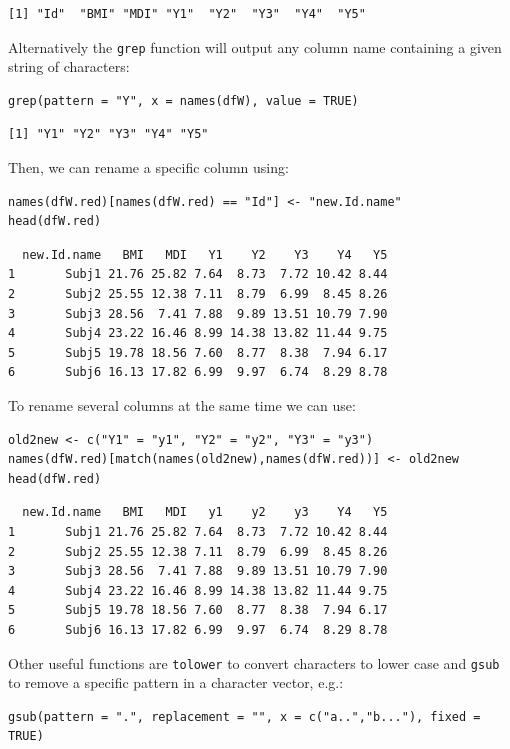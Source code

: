 \documentclass{article}
\begin{document}
\begin{verbatim}
[1] "Id"  "BMI" "MDI" "Y1"  "Y2"  "Y3"  "Y4"  "Y5"
\end{verbatim}

Alternatively the \texttt{grep} function will output any column name
containing a given string of characters:
\lstset{language=r,label= ,caption= ,captionpos=b,numbers=none}
\begin{lstlisting}
grep(pattern = "Y", x = names(dfW), value = TRUE)
\end{lstlisting}

\begin{verbatim}
[1] "Y1" "Y2" "Y3" "Y4" "Y5"
\end{verbatim}

Then, we can rename a specific column using:
\lstset{language=r,label= ,caption= ,captionpos=b,numbers=none}
\begin{lstlisting}
names(dfW.red)[names(dfW.red) == "Id"] <- "new.Id.name"
head(dfW.red)
\end{lstlisting}

\begin{verbatim}
  new.Id.name   BMI   MDI   Y1    Y2    Y3    Y4   Y5
1       Subj1 21.76 25.82 7.64  8.73  7.72 10.42 8.44
2       Subj2 25.55 12.38 7.11  8.79  6.99  8.45 8.26
3       Subj3 28.56  7.41 7.88  9.89 13.51 10.79 7.90
4       Subj4 23.22 16.46 8.99 14.38 13.82 11.44 9.75
5       Subj5 19.78 18.56 7.60  8.77  8.38  7.94 6.17
6       Subj6 16.13 17.82 6.99  9.97  6.74  8.29 8.78
\end{verbatim}

To rename several columns at the same time we can use:
\lstset{language=r,label= ,caption= ,captionpos=b,numbers=none}
\begin{lstlisting}
old2new <- c("Y1" = "y1", "Y2" = "y2", "Y3" = "y3")
names(dfW.red)[match(names(old2new),names(dfW.red))] <- old2new
head(dfW.red)
\end{lstlisting}

\begin{verbatim}
  new.Id.name   BMI   MDI   y1    y2    y3    Y4   Y5
1       Subj1 21.76 25.82 7.64  8.73  7.72 10.42 8.44
2       Subj2 25.55 12.38 7.11  8.79  6.99  8.45 8.26
3       Subj3 28.56  7.41 7.88  9.89 13.51 10.79 7.90
4       Subj4 23.22 16.46 8.99 14.38 13.82 11.44 9.75
5       Subj5 19.78 18.56 7.60  8.77  8.38  7.94 6.17
6       Subj6 16.13 17.82 6.99  9.97  6.74  8.29 8.78
\end{verbatim}

Other useful functions are \texttt{tolower} to convert characters to lower
case and \texttt{gsub} to remove a specific pattern in a character vector, e.g.:
\lstset{language=r,label= ,caption= ,captionpos=b,numbers=none}
\begin{lstlisting}
gsub(pattern = ".", replacement = "", x = c("a..","b..."), fixed = TRUE)
\end{lstlisting}
\end{document}
